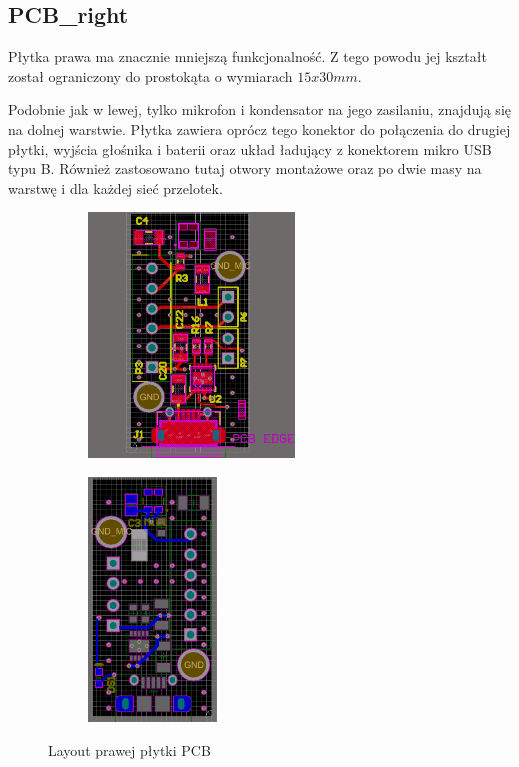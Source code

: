 \subsection{PCB\_right}

Płytka prawa ma znacznie mniejszą funkcjonalność. Z tego powodu jej kształt został ograniczony do prostokąta o wymiarach $15x30mm$. 

Podobnie jak w lewej, tylko mikrofon i kondensator na jego zasilaniu, znajdują się na dolnej warstwie. Płytka zawiera oprócz tego konektor do połączenia do drugiej płytki, wyjścia głośnika i baterii oraz układ ładujący z konektorem mikro USB typu B. Również zastosowano tutaj otwory montażowe oraz po dwie masy na warstwę i dla każdej sieć przelotek.

\begin{figure}[H]
	\centering
	\begin{subfigure}{.45\textwidth}
		\centering
		\includegraphics[height=6.5cm]{zdjecia/PCB/PCB_right_top.png}
	\end{subfigure}
	\begin{subfigure}{.45\textwidth}
		\centering
		\includegraphics[height=6.5cm]{zdjecia/PCB/PCB_right_bottom.png}
	\end{subfigure}
	\caption{\label{PCB_right} Layout prawej płytki PCB}
\end{figure}

